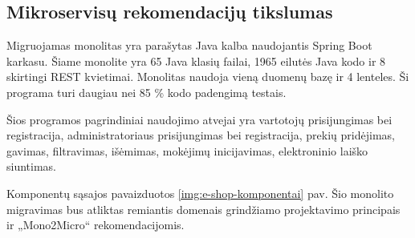 \documentclass{VUMIFPSbakalaurinis}
\begin{document}


\subsection{Mikroservisų rekomendacijų tikslumas}
Migruojamas monolitas yra parašytas Java kalba naudojantis Spring Boot karkasu. Šiame monolite yra 65 Java klasių failai, 1965 eilutės Java kodo ir 8 skirtingi REST kvietimai. Monolitas naudoja vieną duomenų bazę ir 4 lenteles. Ši programa turi daugiau nei 85 \% kodo padengimą testais.

Šios programos pagrindiniai naudojimo atvejai yra vartotojų prisijungimas bei registracija, administratoriaus prisijungimas bei registracija, prekių pridėjimas, gavimas, filtravimas, išėmimas, mokėjimų inicijavimas, elektroninio laiško siuntimas.

Komponentų sąsajos pavaizduotos \ref{img:e-shop-komponentai} pav. Šio monolito migravimas bus atliktas remiantis domenais grindžiamo projektavimo principais ir „Mono2Micro“ rekomendacijomis.
\end{document}
